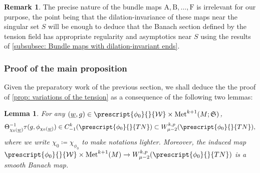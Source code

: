 \documentclass{article}
\numberwithin{equation}{section}        %
\theoremstyle{bfnote}
\newtheorem{lem}[thm]{Lemma}                %
\theoremstyle{definition}
\theoremstyle{bfremark}
\newtheorem{rem}[thm]{Remark}               %
\newcommand{\Met}{\mathrm{Met}}             %
\newcommand{\bmap}[1]{\boldsymbol{\mathrm{#1}}}     %
\begin{document}
\begin{rem}
    The precise nature of the bundle maps $\bmap{A}, \bmap{B}, \ldots , \bmap{F}$ is irrelevant for our purpose, the point being that the dilation-invariance of these maps near the singular set $S$ will be enough to deduce that the Banach section defined by the tension field has appropriate regularity and asymptotics near $S$ using the results of \cref{subsubsec: Bundle maps with dilation-invariant ends}.
\end{rem}


    \subsubsection{Proof of the main proposition}       \label{subsec: proof of the main proposition}

Given the preparatory work of the previous section, we shall deduce the the proof of \cref{prop: variations of the tension} as a consequence of the following two lemmas:

\begin{lem}     \label{lem: regularity w component}
    For any $(\underline{w},g) \in \prescript{\phi_0}{}{\mathcal{W}} \times \Met^{k+1}(M;\mathfrak{S})$,
    \begin{equation*}
        \Theta_{\chi_{0}(\underline{w})}^{-1} \tau(g,\phi_{\chi_{0}(\underline{w})}) \in C^{k}_{-1}(\prescript{\phi_0}{}{TN}) \subset W^{k,p}_{\mu-2}(\prescript{\phi_0}{}{TN}),
    \end{equation*}
    where we write $\chi_0 \coloneqq \chi_{\phi_0}$ to make notations lighter. Moreover, the induced map $\prescript{\phi_0}{}{\mathcal{W}} \times \Met^{k+1}(M) \to W^{k,p}_{\mu-2}(\prescript{\phi_0}{}{TN})$ is a smooth Banach map.
\end{lem}
\end{document}
